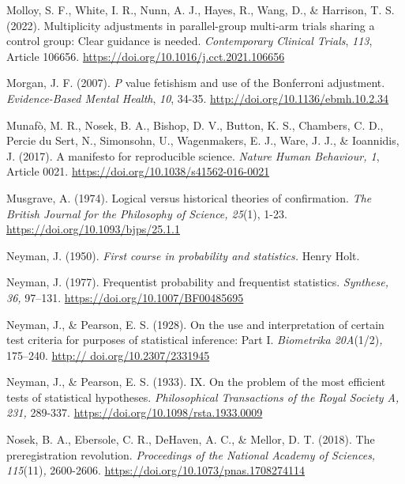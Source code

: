 \documentclass[authordate, meta]{jote-new-article}
\begin{document}
	Molloy, S. F., White, I. R., Nunn, A. J., Hayes, R., Wang, D., \& Harrison, T. S. (2022). Multiplicity adjustments in parallel-group multi-arm trials sharing a control group: Clear guidance is needed. \emph{Contemporary Clinical Trials}, \emph{113}, Article 106656. \url{https://doi.org/10.1016/j.cct.2021.106656}



	Morgan, J. F. (2007). \emph{P} value fetishism and use of the Bonferroni adjustment. \emph{Evidence-Based Mental Health}, \emph{10}, 34-35. \url{http://doi.org/10.1136/ebmh.10.2.34}



	Munafò, M. R., Nosek, B. A., Bishop, D. V., Button, K. S., Chambers, C. D., Percie du Sert, N., Simonsohn, U., Wagenmakers, E. J., Ware, J. J., \& Ioannidis, J. (2017). A manifesto for reproducible science. \emph{Nature Human Behaviour, 1}, Article 0021. \url{https://doi.org/10.1038/s41562-016-0021}



	Musgrave, A. (1974). Logical versus historical theories of confirmation. \emph{The British Journal for the Philosophy of Science, 25}(1), 1-23. \url{https://doi.org/10.1093/bjps/25.1.1}



	Neyman, J. (1950). \emph{First course in probability and statistics.} Henry Holt.



	Neyman, J. (1977). Frequentist probability and frequentist statistics. \emph{Synthese, 36,} 97--131. \url{https://doi.org/10.1007/BF00485695}



	Neyman, J., \& Pearson, E. S. (1928). On the use and interpretation of certain test criteria for purposes of statistical inference: Part I. \emph{Biometrika 20}\emph{A}(1/2)\emph{,} 175--240. \url{http:// doi.org/10.2307/2331945}



	Neyman, J., \& Pearson, E. S. (1933). IX. On the problem of the most efficient tests of statistical hypotheses. \emph{Philosophical Transactions of the Royal Society A, 231,} 289-337. \url{https://doi.org/10.1098/rsta.1933.0009}



	Nosek, B. A., Ebersole, C. R., DeHaven, A. C., \& Mellor, D. T. (2018). The preregistration revolution. \emph{Proceedings of the National Academy of Sciences, 115}(11)\emph{,} 2600-2606. \url{https://doi.org/10.1073/pnas.1708274114}
\end{document}
